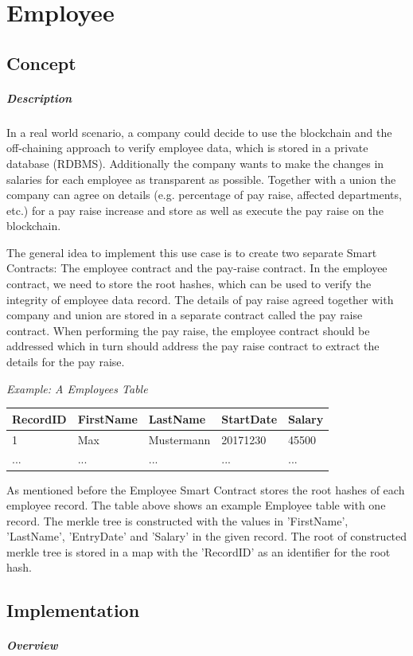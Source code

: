 \section{Employee}
\subsection{Concept}
\subparagraph{Description}
In a real world scenario, a company could decide to use the blockchain and the off-chaining approach to verify employee data, which is stored in a private database (RDBMS). Additionally the company wants to make the changes in salaries for each employee as transparent as possible. Together with a union the company can agree on details (e.g. percentage of pay raise, affected departments, etc.) for a pay raise increase and store as well as execute the pay raise on the blockchain.

The general idea to implement this use case is to create two separate Smart Contracts: The employee contract and the pay-raise contract. In the employee contract, we need to store the root hashes, which can be used to verify the integrity of employee data record. The details of pay raise agreed together with company and union are stored in a separate contract called the pay raise contract. When performing the pay raise, the employee contract should be addressed which in turn should address the pay raise contract to extract the details for the pay raise.


\textit{Example: A Employees Table}
\begin{center}
    \begin{tabular}{| l | l | l | l | l |}
    \hline
    RecordID & FirstName & LastName & StartDate & Salary \\ \hline
    1 & Max & Mustermann & 20171230 & 45500 \\ \hline
    ... & ... & ... & ... & ... \\ \hline
    \end{tabular}
\end{center}

As mentioned before the Employee Smart Contract stores the root hashes of each employee record. The table above shows an example Employee table with one record. The merkle tree is constructed with the values in 'FirstName', 'LastName', 'EntryDate' and 'Salary' in the given record. The root of constructed merkle tree is stored in a map with the 'RecordID' as an identifier for the root hash.

\subsection{Implementation}
\subparagraph{Overview}

